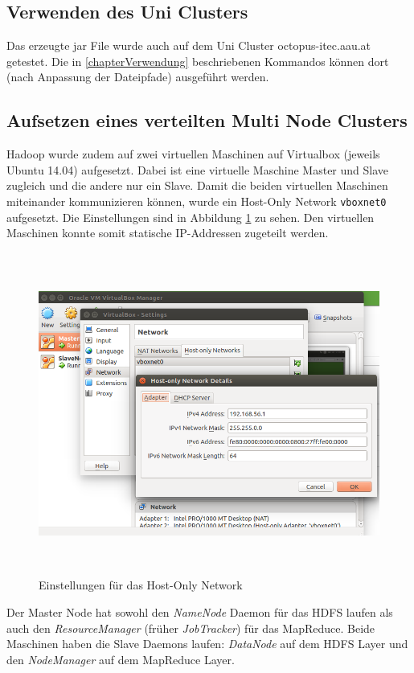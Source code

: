 \documentclass[paper=a4, fontsize=11pt]{scrartcl} %
\numberwithin{equation}{section} %
\numberwithin{figure}{section} %
\numberwithin{table}{section} %
\begin{document}
\subsection{Verwenden des Uni Clusters}
Das erzeugte jar File wurde auch auf dem Uni Cluster octopus-itec.aau.at getestet. Die in \ref{chapterVerwendung} beschriebenen Kommandos können dort (nach Anpassung der Dateipfade) ausgeführt werden.

\subsection{Aufsetzen eines verteilten Multi Node Clusters}
Hadoop wurde zudem auf zwei virtuellen Maschinen auf Virtualbox (jeweils Ubuntu 14.04) aufgesetzt. Dabei ist eine virtuelle Maschine Master und Slave zugleich und die andere nur ein Slave. 
Damit die beiden virtuellen Maschinen miteinander kommunizieren können, wurde ein Host-Only Network \lstinline$vboxnet0$ aufgesetzt. Die Einstellungen sind in Abbildung \ref{fig:s3} zu sehen. Den virtuellen Maschinen konnte somit statische IP-Addressen zugeteilt werden.

\begin{figure}[H]
\begin{center}
	\includegraphics[height=300pt]{images/screen3}
	\caption{Einstellungen für das Host-Only Network}
	\label{fig:s3}
\end{center}
\end{figure}

Der Master Node hat sowohl den \emph{NameNode} Daemon für das HDFS laufen als auch den \emph{ResourceManager} (früher \emph{JobTracker}) für das MapReduce. Beide Maschinen haben die Slave Daemons laufen: \emph{DataNode} auf dem HDFS Layer und den \emph{NodeManager} auf dem MapReduce Layer. 
\end{document}
